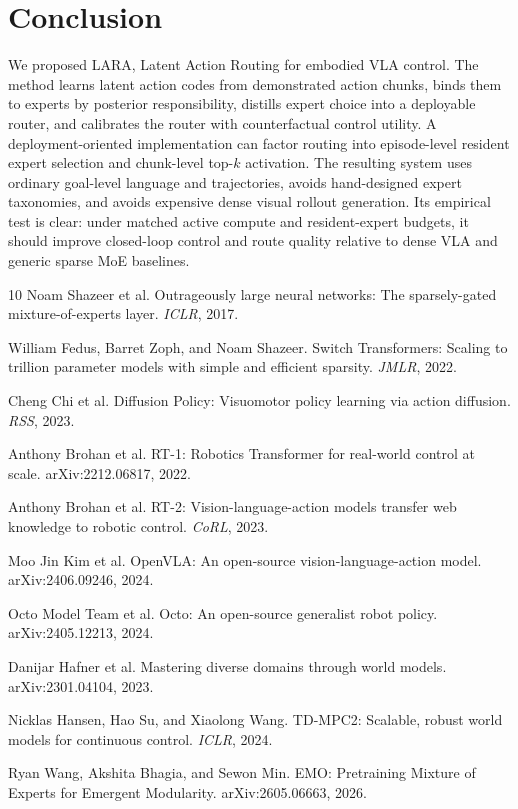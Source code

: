 \documentclass[10pt]{article}
\begin{document}
\section{Conclusion}

We proposed LARA, Latent Action Routing for embodied VLA control. The method learns latent action codes from demonstrated action chunks, binds them to experts by posterior responsibility, distills expert choice into a deployable router, and calibrates the router with counterfactual control utility. A deployment-oriented implementation can factor routing into episode-level resident expert selection and chunk-level top-$k$ activation. The resulting system uses ordinary goal-level language and trajectories, avoids hand-designed expert taxonomies, and avoids expensive dense visual rollout generation. Its empirical test is clear: under matched active compute and resident-expert budgets, it should improve closed-loop control and route quality relative to dense VLA and generic sparse MoE baselines.

\begin{thebibliography}{10}
Noam Shazeer et al.
\newblock Outrageously large neural networks: The sparsely-gated mixture-of-experts layer.
\newblock \emph{ICLR}, 2017.

William Fedus, Barret Zoph, and Noam Shazeer.
\newblock Switch Transformers: Scaling to trillion parameter models with simple and efficient sparsity.
\newblock \emph{JMLR}, 2022.

Cheng Chi et al.
\newblock Diffusion Policy: Visuomotor policy learning via action diffusion.
\newblock \emph{RSS}, 2023.

Anthony Brohan et al.
\newblock RT-1: Robotics Transformer for real-world control at scale.
\newblock arXiv:2212.06817, 2022.

Anthony Brohan et al.
\newblock RT-2: Vision-language-action models transfer web knowledge to robotic control.
\newblock \emph{CoRL}, 2023.

Moo Jin Kim et al.
\newblock OpenVLA: An open-source vision-language-action model.
\newblock arXiv:2406.09246, 2024.

Octo Model Team et al.
\newblock Octo: An open-source generalist robot policy.
\newblock arXiv:2405.12213, 2024.

Danijar Hafner et al.
\newblock Mastering diverse domains through world models.
\newblock arXiv:2301.04104, 2023.

Nicklas Hansen, Hao Su, and Xiaolong Wang.
\newblock TD-MPC2: Scalable, robust world models for continuous control.
\newblock \emph{ICLR}, 2024.

Ryan Wang, Akshita Bhagia, and Sewon Min.
\newblock EMO: Pretraining Mixture of Experts for Emergent Modularity.
\newblock arXiv:2605.06663, 2026.
\end{thebibliography}
\end{document}
